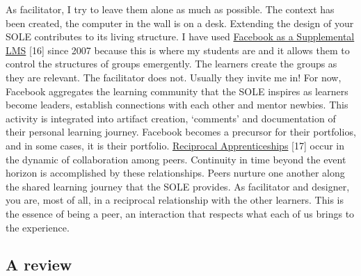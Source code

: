 As facilitator, I try to leave them alone as much as possible. The
context has been created, the computer in the wall is on a desk.
Extending the design of your SOLE contributes to its living structure. I
have used
\href{http://community.telecentre.org/profiles/blogs/facebook-as-a-supplemental-lms}{Facebook
as a Supplemental LMS} {{[}16{]}} since 2007 because this is where my
students are and it allows them to control the structures of groups
emergently. The learners create the groups as they are relevant. The
facilitator does not. Usually they invite me in! For now, Facebook
aggregates the learning community that the SOLE inspires as learners
become leaders, establish connections with each other and mentor
newbies. This activity is integrated into artifact creation, `comments'
and documentation of their personal learning journey. Facebook becomes a
precursor for their portfolios, and in some cases, it is their
portfolio.
\href{http://starwars.wikia.com/wiki/Reciprocal_apprenticeship}{Reciprocal
Apprenticeships} {{[}17{]}} occur in the dynamic of collaboration among
peers. Continuity in time beyond the event horizon is accomplished by
these relationships. Peers nurture one another along the shared learning
journey that the SOLE provides. As facilitator and designer, you are,
most of all, in a reciprocal relationship with the other learners. This
is the essence of being a peer, an interaction that respects what each
of us brings to the experience.

\hypertarget{a-review}{%
\subsection{A review}\label{a-review}}

